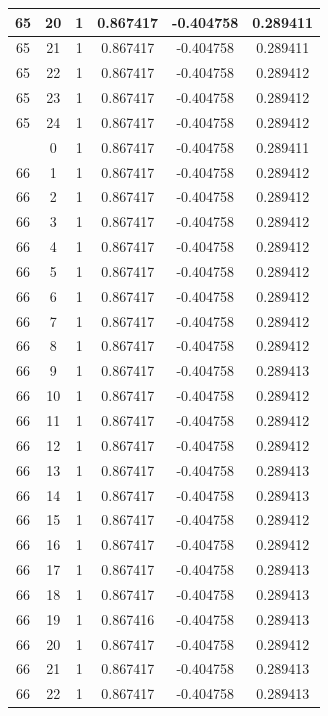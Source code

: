\documentclass[12pt,a4paper]{article}
\numberwithin{equation}{section}
\numberwithin{figure}{section}
\numberwithin{table}{section}
\begin{document}
\begin{longtable}{|c|c|c|c|c|c|}
65 & 20 & 1 & 0.867417 & -0.404758 & 0.289411 \\ \hline
65 & 21 & 1 & 0.867417 & -0.404758 & 0.289411 \\ \hline
65 & 22 & 1 & 0.867417 & -0.404758 & 0.289412 \\ \hline
65 & 23 & 1 & 0.867417 & -0.404758 & 0.289412 \\ \hline
65 & 24 & 1 & 0.867417 & -0.404758 & 0.289412 \\ \hline
\pagebreak
66 & 0 & 1 & 0.867417 & -0.404758 & 0.289411 \\ \hline
66 & 1 & 1 & 0.867417 & -0.404758 & 0.289412 \\ \hline
66 & 2 & 1 & 0.867417 & -0.404758 & 0.289412 \\ \hline
66 & 3 & 1 & 0.867417 & -0.404758 & 0.289412 \\ \hline
66 & 4 & 1 & 0.867417 & -0.404758 & 0.289412 \\ \hline
66 & 5 & 1 & 0.867417 & -0.404758 & 0.289412 \\ \hline
66 & 6 & 1 & 0.867417 & -0.404758 & 0.289412 \\ \hline
66 & 7 & 1 & 0.867417 & -0.404758 & 0.289412 \\ \hline
66 & 8 & 1 & 0.867417 & -0.404758 & 0.289412 \\ \hline
66 & 9 & 1 & 0.867417 & -0.404758 & 0.289413 \\ \hline
66 & 10 & 1 & 0.867417 & -0.404758 & 0.289412 \\ \hline
66 & 11 & 1 & 0.867417 & -0.404758 & 0.289412 \\ \hline
66 & 12 & 1 & 0.867417 & -0.404758 & 0.289412 \\ \hline
66 & 13 & 1 & 0.867417 & -0.404758 & 0.289413 \\ \hline
66 & 14 & 1 & 0.867417 & -0.404758 & 0.289413 \\ \hline
66 & 15 & 1 & 0.867417 & -0.404758 & 0.289412 \\ \hline
66 & 16 & 1 & 0.867417 & -0.404758 & 0.289412 \\ \hline
66 & 17 & 1 & 0.867417 & -0.404758 & 0.289413 \\ \hline
66 & 18 & 1 & 0.867417 & -0.404758 & 0.289413 \\ \hline
66 & 19 & 1 & 0.867416 & -0.404758 & 0.289413 \\ \hline
66 & 20 & 1 & 0.867417 & -0.404758 & 0.289412 \\ \hline
66 & 21 & 1 & 0.867417 & -0.404758 & 0.289413 \\ \hline
66 & 22 & 1 & 0.867417 & -0.404758 & 0.289413 \\ \hline

\end{longtable}
\end{document}
